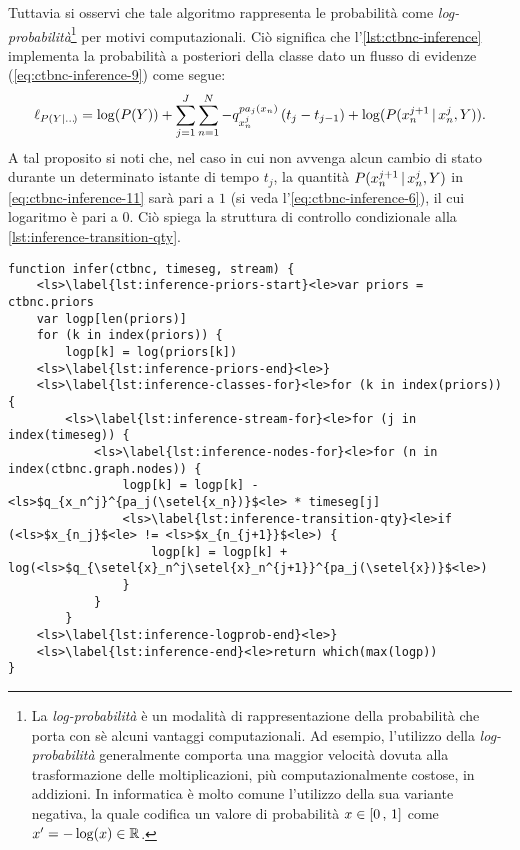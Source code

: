 Tuttavia si osservi che tale algoritmo rappresenta le probabilità come \emph{log-probabilità}\footnote{La \emph{log-probabilità} è un modalità di rappresentazione della probabilità che porta con sè alcuni vantaggi computazionali. Ad esempio, l'utilizzo della \emph{log-probabilità} generalmente comporta una maggior velocità dovuta alla trasformazione delle moltiplicazioni, più computazionalmente costose, in addizioni. In informatica è molto comune l'utilizzo della sua variante negativa, la quale codifica un valore di probabilità $\mathnormal{x} \in [0\,,\,1]$ come $\mathnormal{x}^{\prime}=-\log(\mathnormal{x}) \in \mathbb{R}$.} per motivi computazionali. Ciò significa che l'\autoref{lst:ctbnc-inference} implementa la probabilità a posteriori della classe dato un flusso di evidenze (\autoref{eq:ctbnc-inference-9}) come segue:
\small
\begin{equation}\label{eq:ctbnc-inference-11}
\ell_{P(\mathnormal{Y}|\dots\negthinspace{})} = \log (P(\mathnormal{Y})) + \sum_{j=1}^{J}\sum_{n=1}^N-q_{\mathnormal{x}_n^j}^{pa_j(\mathnormal{x}_n)}\,(t_j - t_{j-1}) + \log (P(\mathnormal{x}_n^{j+1}\,\arrowvert\,\mathnormal{x}_n^j,\mathnormal{Y}))\text{\normalsize .}
\end{equation}
\normalsize
A tal proposito si noti che, nel caso in cui non avvenga alcun cambio di stato durante un determinato istante di tempo $t_j$, la quantità $P(\mathnormal{x}_n^{j+1}\,\arrowvert\,\mathnormal{x}_n^j,\mathnormal{Y})$ in \ref{eq:ctbnc-inference-11} sarà pari a $1$ (si veda l'\autoref{eq:ctbnc-inference-6}), il cui logaritmo è pari a $0$. Ciò spiega la struttura di controllo condizionale alla \autoref{lst:inference-transition-qty}.
\begin{lstlisting}[caption=Inferenza su un classificatore \acs{CTBN},label=lst:ctbnc-inference, language=pseudo]
function infer(ctbnc, timeseg, stream) {
    <ls>\label{lst:inference-priors-start}<le>var priors = ctbnc.priors
    var logp[len(priors)]
    for (k in index(priors)) {
        logp[k] = log(priors[k])
    <ls>\label{lst:inference-priors-end}<le>}
    <ls>\label{lst:inference-classes-for}<le>for (k in index(priors)) {
        <ls>\label{lst:inference-stream-for}<le>for (j in index(timeseg)) {
            <ls>\label{lst:inference-nodes-for}<le>for (n in index(ctbnc.graph.nodes)) {
                logp[k] = logp[k] - <ls>$q_{x_n^j}^{pa_j(\setel{x_n})}$<le> * timeseg[j]
                <ls>\label{lst:inference-transition-qty}<le>if (<ls>$x_{n_j}$<le> != <ls>$x_{n_{j+1}}$<le>) {
                    logp[k] = logp[k] + log(<ls>$q_{\setel{x}_n^j\setel{x}_n^{j+1}}^{pa_j(\setel{x})}$<le>)
                }
            }
        }
    <ls>\label{lst:inference-logprob-end}<le>}
    <ls>\label{lst:inference-end}<le>return which(max(logp))
}
\end{lstlisting}\vspace*{8pt}
